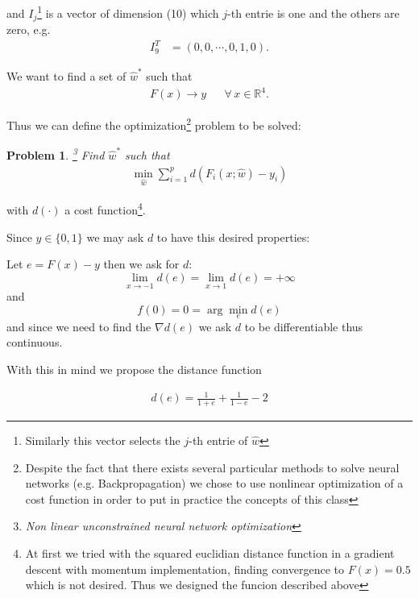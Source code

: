 \documentclass[a4paper,10pt,twocolumn]{article}
\newtheorem{prob}{Problem}
\begin{document}
and $I_j$\footnote{Similarly this vector selects the $j$-th entrie of $\hat{w}$} is a vector of dimension (10) which $j$-th entrie is one and the others are zero, e.g. 
\begin{equation}
\begin{aligned}
I_9^T&=\left(0,0,\cdots,0,1,0\right).
\end{aligned}
\end{equation}

We want to find a set of $\hat{w}^*$ such that 
\begin{equation}
\begin{aligned}
F(x)\rightarrow y && \forall\, x \in \mathbb{R}^4. 
\end{aligned}
\end{equation}

Thus we can define the optimization\footnote{Despite the fact that there exists several particular methods to solve neural networks (e.g. Backpropagation) we chose to use nonlinear optimization of a cost function in order to put in practice the concepts of this class } problem to be solved:

\begin{prob}\footnote{Non linear unconstrained neural network optimization}
Find $\hat{w}^*$ such that 
\begin{equation}
\begin{aligned} \label{problem1}
\min_{\hat{w}}\sum_{i=1}^p d(F_i(x;\hat{w})-y_i)
\end{aligned}
\end{equation}
\end{prob}

with $d(\cdot)$ a cost function\footnote{At first we tried with the squared euclidian distance function in a gradient descent with momentum implementation, finding convergence to  $F(x) = 0.5$ which is not desired. Thus we designed the funcion described above}. 

Since $y\in\{0,1\}$ we may ask $d$ to have this desired properties:

Let $e=F(x)-y$ then we ask for $d$:
$$\lim_{x\rightarrow-1} d(e)=\lim_{x\rightarrow 1} d(e)=+\infty$$ and 
$$f(0)=0=\arg\min _{e} d(e)$$
and since we need to find the $\nabla d(e)$ we ask $d$ to be differentiable thus continuous. 

With this in mind we propose the distance function 

\begin{equation}
\begin{aligned}\label{eq2}
d(e)=\frac{1}{1+e}+\frac{1}{1-e}-2
\end{aligned}
\end{equation}
\end{document}
